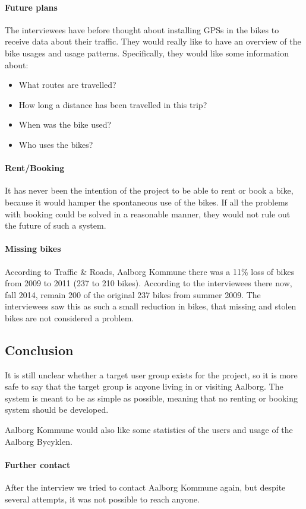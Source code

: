 \paragraph{Future plans}
The interviewees have before thought about installing GPSs in the bikes to receive data about their traffic.
They would really like to have an overview of the bike usages and usage patterns.
Specifically, they would like some information about:
\begin{itemize}
\item What routes are travelled?
\item How long a distance has been travelled in this trip?
\item When was the bike used?
\item Who uses the bikes?
\end{itemize}

\paragraph{Rent/Booking}
It has never been the intention of the project to be able to rent or book a bike, because it would hamper the spontaneous use of the bikes.
If all the problems with booking could be solved in a reasonable manner, they would not rule out the future of such a system.

\paragraph{Missing bikes}
According to Traffic \& Roads, Aalborg Kommune\cite{cykelplanlaegning} there was a 11\% loss of bikes from 2009 to 2011 (237 to 210 bikes).
According to the interviewees there now, fall 2014, remain 200 of the original 237 bikes from summer 2009.
The interviewees saw this as such a small reduction in bikes, that missing and stolen bikes are not considered a problem.

\subsection{Conclusion}
It is still unclear whether a target user group exists for the project, so it is more safe to say that the target group is anyone living in or visiting Aalborg.
The system is meant to be as simple as possible, meaning that no renting or booking system should be developed.

Aalborg Kommune would also like some statistics of the users and usage of the Aalborg Bycyklen.

\paragraph{Further contact}
After the interview we tried to contact Aalborg Kommune again, but despite several attempts, it was not possible to reach anyone.
